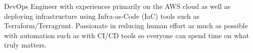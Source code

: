 

\begin{cvparagraph}

DevOps Engineer with experiences primarily on the AWS cloud as well as deploying infrastructure using Infra-as-Code (IaC) tools such as Terraform/Terragrunt. Passionate in reducing human effort as much as possible with automation such as with CI/CD tools so everyone can spend time on what truly matters.
\end{cvparagraph}
